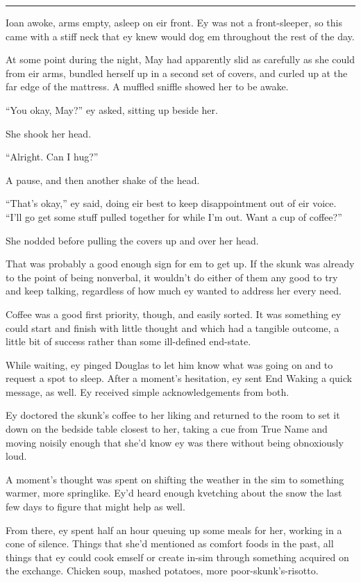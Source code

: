 \begin{center}\rule{0.5\linewidth}{0.5pt}\end{center}

Ioan awoke, arms empty, asleep on eir front. Ey was not a front-sleeper, so this came with a stiff neck that ey knew would dog em throughout the rest of the day.

At some point during the night, May had apparently slid as carefully as she could from eir arms, bundled herself up in a second set of covers, and curled up at the far edge of the mattress. A muffled sniffle showed her to be awake.

``You okay, May?'' ey asked, sitting up beside her.

She shook her head.

``Alright. Can I hug?''

A pause, and then another shake of the head.

``That's okay,'' ey said, doing eir best to keep disappointment out of eir voice. ``I'll go get some stuff pulled together for while I'm out. Want a cup of coffee?''

She nodded before pulling the covers up and over her head.

That was probably a good enough sign for em to get up. If the skunk was already to the point of being nonverbal, it wouldn't do either of them any good to try and keep talking, regardless of how much ey wanted to address her every need.

Coffee was a good first priority, though, and easily sorted. It was something ey could start and finish with little thought and which had a tangible outcome, a little bit of success rather than some ill-defined end-state.

While waiting, ey pinged Douglas to let him know what was going on and to request a spot to sleep. After a moment's hesitation, ey sent End Waking a quick message, as well. Ey received simple acknowledgements from both.

Ey doctored the skunk's coffee to her liking and returned to the room to set it down on the bedside table closest to her, taking a cue from True Name and moving noisily enough that she'd know ey was there without being obnoxiously loud.

A moment's thought was spent on shifting the weather in the sim to something warmer, more springlike. Ey'd heard enough kvetching about the snow the last few days to figure that might help as well.

From there, ey spent half an hour queuing up some meals for her, working in a cone of silence. Things that she'd mentioned as comfort foods in the past, all things that ey could cook emself or create in-sim through something acquired on the exchange. Chicken soup, mashed potatoes, more poor-skunk's-risotto.

